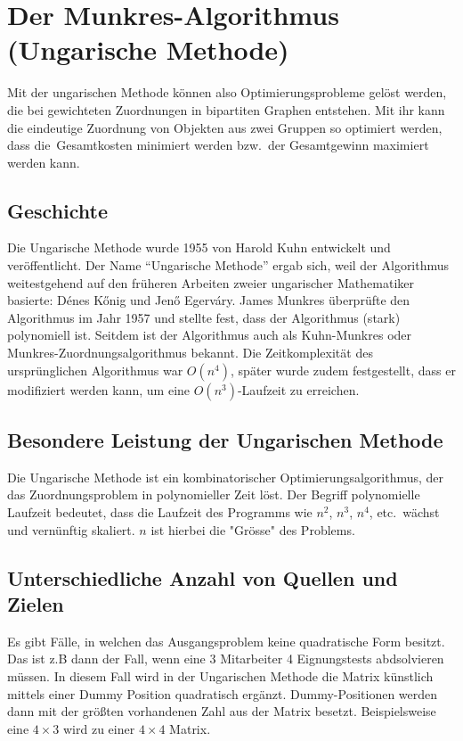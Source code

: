 %
%
%
\section{Der Munkres-Algorithmus (Ungarische Methode)
\label{munkres:section:teil3}}

Mit der ungarischen Methode können also Optimierungsprobleme gelöst
werden, die bei gewichteten Zuordnungen in bipartiten Graphen entstehen.
Mit ihr kann die eindeutige Zuordnung von Objekten aus zwei Gruppen so
optimiert werden, dass die Gesamtkosten minimiert werden bzw.~der
Gesamtgewinn maximiert werden kann. 

\subsection{Geschichte
\label{munkres:subsection:malorum}}
Die Ungarische Methode wurde 1955 von Harold Kuhn entwickelt und veröffentlicht.
Der Name ``Ungarische Methode'' ergab sich, weil der Algorithmus
weitestgehend auf den früheren Arbeiten zweier ungarischer Mathematiker
basierte: Dénes Kőnig und Jenő Egerváry.
James Munkres überprüfte den Algorithmus im Jahr 1957 und stellte fest,
dass der Algorithmus (stark) polynomiell ist.
Seitdem ist der Algorithmus auch als Kuhn-Munkres oder
Munkres-Zuordnungsalgorithmus bekannt.
Die Zeitkomplexität des ursprünglichen Algorithmus war $O(n^4)$,
später wurde zudem festgestellt, dass er modifiziert werden kann,
um eine  $O(n^3)$-Laufzeit zu erreichen.

\subsection{Besondere Leistung der Ungarischen Methode
\label{munkres:subsection:malorum}}
Die Ungarische Methode ist ein kombinatorischer Optimierungsalgorithmus, der das Zuordnungsproblem
in polynomieller Zeit löst.
Der Begriff polynomielle Laufzeit bedeutet, dass die Laufzeit des Programms
wie $n^2$, $n^3$, $n^4$, etc.~wächst und vernünftig skaliert. $n$ ist hierbei die "Grösse" des Problems.

\subsection{Unterschiedliche Anzahl von Quellen und Zielen
\label{munkres:subsection:malorum}}
Es gibt Fälle, in welchen das Ausgangsproblem keine quadratische Form besitzt. Das ist z.B dann der Fall, wenn eine 3 Mitarbeiter 4 Eignungstests abdsolvieren müssen. In diesem Fall wird in der Ungarischen Methode die Matrix künstlich mittels einer Dummy Position quadratisch ergänzt. Dummy-Positionen werden dann mit der größten vorhandenen Zahl aus der Matrix besetzt. Beispielsweise eine $4\times 3$ wird zu einer $4\times 4$ Matrix.

